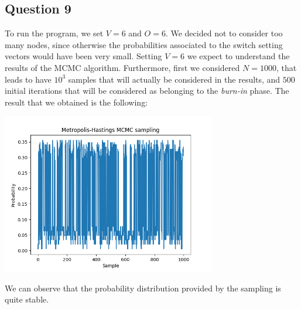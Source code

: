 \documentclass[]{article}
\begin{document}
\subsection*{Question 9}
To run the program, we set $V=6$ and $O=6$. We decided not to consider too many nodes, since otherwise the probabilities associated to the switch setting vectors would have been very small. Setting $V=6$ we expect to understand the results of the MCMC algorithm. Furthermore, first we considered $N=1000$, that leads to have $10^3$ samples that will actually be considered in the results, and $500$ initial iterations that will be considered as belonging to the \emph{burn-in} phase. The result that we obtained is the following:
\begin{center}
	\includegraphics[height=7cm]{task3/V_6_T_6_N_1000.png}
\end{center}
We can observe that the probability distribution provided by the sampling is quite stable.
\end{document}
